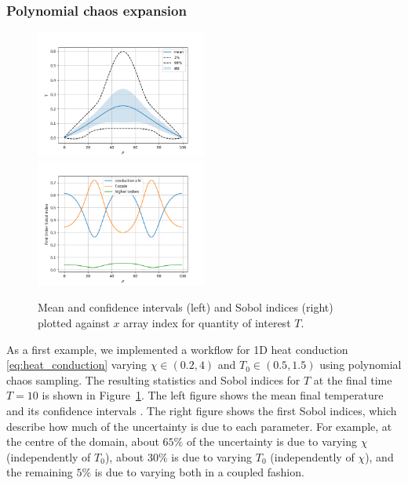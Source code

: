 \subsubsection{Polynomial chaos expansion}\label{sec:PCE}

\begin{figure}[tbp]
\includegraphics[width=0.5\textwidth]{T_vs_x_mean_ci.png}
\includegraphics[width=0.5\textwidth]{T_vs_x_sobols.png}
\caption{%
Mean and confidence intervals (left) and Sobol indices (right) plotted
against $x$ array index for quantity of interest $T$. 
\label{fig:conduction}
}
\end{figure}

As a first example, we implemented a workflow for 1D heat conduction
\eqref{eq:heat_conduction} varying $\chi\in(0.2,4)$ and $T_0\in(0.5,1.5)$
using polynomial chaos sampling.
The resulting statistics and Sobol indices for $T$ at the final time $T=10$ is shown in %
Figure\ \ref{fig:conduction}.
The left figure shows the mean final temperature and its confidence intervals
.
The right figure shows the first Sobol indices, which describe how much of the
uncertainty is due to each parameter.
For example, at the centre of the domain, about $65\%$ of the uncertainty is
due to varying $\chi$ (independently of $T_0$), about $30\%$ is due to varying
$T_0$ (independently of $\chi$), and the remaining $5\%$ is due to varying both
in a coupled fashion.

